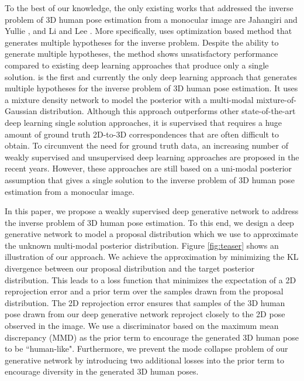 \documentclass{bmvc2k}
\begin{document}
To the best of our knowledge, the only existing works that addressed the inverse problem of 3D human pose estimation from a monocular image are Jahangiri and Yullie \cite{jahangiri2017generating}, and Li and Lee \cite{Li_2019_CVPR}. More specifically, \cite{jahangiri2017generating} uses optimization based method that generates multiple hypotheses for the inverse problem. Despite the ability to generate multiple hypotheses, the method shows unsatisfactory performance compared to existing deep learning approaches that produce only a single solution. \cite{Li_2019_CVPR} is the first and currently the only deep learning approach that generates multiple hypotheses for the inverse problem of 3D human pose estimation. It uses a mixture density network to model the posterior with a multi-modal  mixture-of-Gaussian distribution. Although this approach outperforms other state-of-the-art deep learning single solution approaches, it is supervised that requires a huge amount of ground truth 2D-to-3D correspondences that are often difficult to obtain. To circumvent the need for ground truth data, an increasing number of weakly supervised \cite{Wandt2019RepNet, tung2017adversarial, drover2018can, kanazawa2018end} and unsupervised \cite{rhodin2018unsupervised}  deep learning approaches are proposed in the recent years. However, these approaches are still based on a uni-modal posterior assumption that gives a single solution to the inverse problem of 3D human pose estimation from a monocular image. 

In this paper, we propose a weakly supervised deep generative network to address the inverse problem of 3D human pose estimation. To this end, we design a deep generative network to model a proposal distribution which we use to approximate the unknown multi-modal posterior distribution. Figure \ref{fig:teaser} shows an illustration of our approach. We achieve the approximation by minimizing the KL divergence between our proposal distribution and the target posterior distribution. This leads to a loss function that minimizes the expectation of a 2D reprojection error and a prior term over the samples drawn from the proposal distribution. The 2D reprojection error ensures that samples of the 3D human pose drawn from our deep generative network reproject closely to the 2D pose observed in the image. We use a discriminator based on the maximum mean discrepancy (MMD) \cite{li2017mmd, binkowski2018demystifying} as the prior term to encourage the generated 3D human pose to be ``human-like". Furthermore, we prevent the mode collapse problem of our generative network by introducing two additional losses \cite{yang2019diversity, zhu2017toward}  into the prior term to encourage diversity in the generated 3D human poses.
\end{document}
